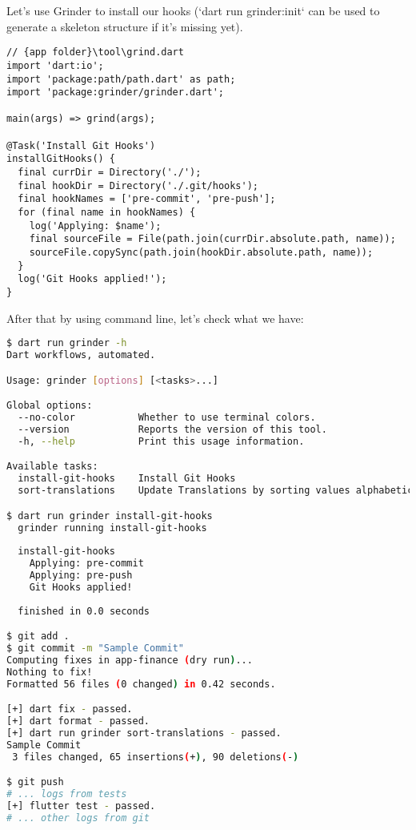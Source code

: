 \noindent Let's use Grinder to install our hooks (`dart run grinder:init` can be used to generate a skeleton 
structure if it's missing yet).

\begin{lstlisting}
// {app folder}\tool\grind.dart
import 'dart:io';
import 'package:path/path.dart' as path;
import 'package:grinder/grinder.dart';

main(args) => grind(args);

@Task('Install Git Hooks')
installGitHooks() {
  final currDir = Directory('./');
  final hookDir = Directory('./.git/hooks');
  final hookNames = ['pre-commit', 'pre-push'];
  for (final name in hookNames) {
    log('Applying: $name');
    final sourceFile = File(path.join(currDir.absolute.path, name));
    sourceFile.copySync(path.join(hookDir.absolute.path, name));
  }
  log('Git Hooks applied!');
}
\end{lstlisting}

\noindent After that by using command line, let's check what we have:

\begin{lstlisting}[language=bash]
$ dart run grinder -h
Dart workflows, automated.

Usage: grinder [options] [<tasks>...]

Global options:
  --no-color           Whether to use terminal colors.
  --version            Reports the version of this tool.
  -h, --help           Print this usage information.

Available tasks:
  install-git-hooks    Install Git Hooks
  sort-translations    Update Translations by sorting values alphabetically

$ dart run grinder install-git-hooks
  grinder running install-git-hooks
  
  install-git-hooks
    Applying: pre-commit
    Applying: pre-push
    Git Hooks applied!
  
  finished in 0.0 seconds

$ git add .
$ git commit -m "Sample Commit"
Computing fixes in app-finance (dry run)...
Nothing to fix!
Formatted 56 files (0 changed) in 0.42 seconds.

[+] dart fix - passed.
[+] dart format - passed.
[+] dart run grinder sort-translations - passed.
Sample Commit
 3 files changed, 65 insertions(+), 90 deletions(-)

$ git push
# ... logs from tests
[+] flutter test - passed.
# ... other logs from git
\end{lstlisting}


